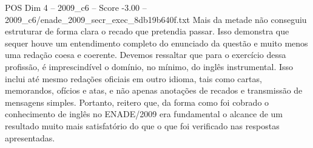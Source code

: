 \begin{textsample}{POS Dim 4 – 2009\_c6 – Score -3.00 – 2009\_c6/enade\_2009\_secr\_exec\_8db19b640f.txt}
Mais da metade não conseguiu estruturar de forma clara o recado que pretendia passar.
Isso demonstra que sequer houve um entendimento completo do enunciado da questão e muito menos uma redação coesa e coerente.
Devemos ressaltar que para o exercício dessa profissão, é imprescindível o domínio, no mínimo, do inglês instrumental.
Isso inclui até mesmo redações oficiais em outro idioma, tais como cartas, memorandos, ofícios e atas, e não apenas anotações de recados e transmissão de mensagens simples.
Portanto, reitero que, da forma como foi cobrado o conhecimento de inglês no ENADE/2009 era fundamental o alcance de um resultado muito mais satisfatório do que o que foi verificado nas respostas apresentadas.

\end{textsample}
